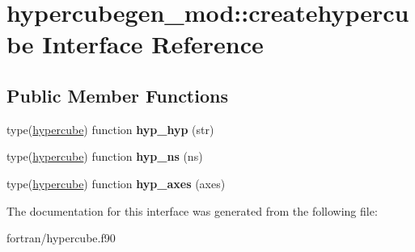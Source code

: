 \hypertarget{interfacehypercubegen__mod_1_1createhypercube}{}\section{hypercubegen\+\_\+mod\+:\+:createhypercube Interface Reference}
\label{interfacehypercubegen__mod_1_1createhypercube}
\subsection*{Public Member Functions}
\begin{DoxyCompactItemize}
\item 
\mbox{\label{interfacehypercubegen__mod_1_1createhypercube_a4554b7dc7f93250b3a75fc73adea2e4d}} 
type(\hyperlink{structhypercubegen__mod_1_1hypercube}{hypercube}) function {\bfseries hyp\+\_\+hyp} (str)
\item 
\mbox{\label{interfacehypercubegen__mod_1_1createhypercube_aba7a5562879035c4e55f5302fdd55014}} 
type(\hyperlink{structhypercubegen__mod_1_1hypercube}{hypercube}) function {\bfseries hyp\+\_\+ns} (ns)
\item 
\mbox{\label{interfacehypercubegen__mod_1_1createhypercube_a2f3f9d9a5555001d052793eca3e0fd73}} 
type(\hyperlink{structhypercubegen__mod_1_1hypercube}{hypercube}) function {\bfseries hyp\+\_\+axes} (axes)
\end{DoxyCompactItemize}


The documentation for this interface was generated from the following file\+:\begin{DoxyCompactItemize}
\item 
fortran/hypercube.\+f90\end{DoxyCompactItemize}
